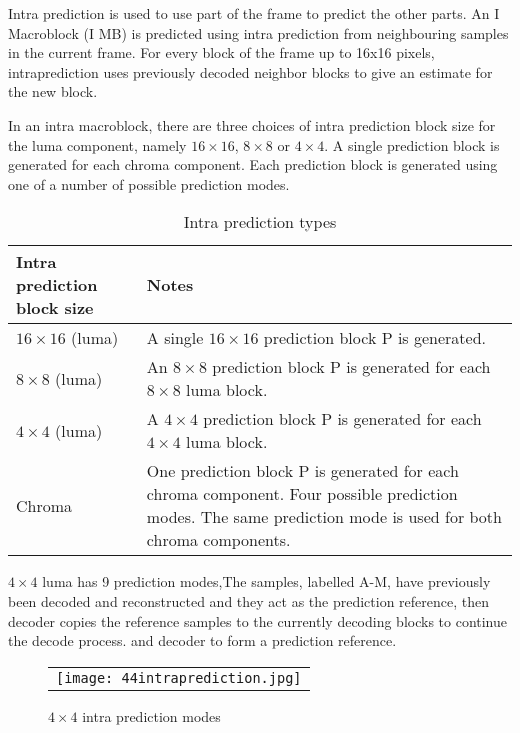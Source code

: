 \documentclass[../main.tex]{subfiles}
\begin{document}
Intra prediction is used to use part of the frame
to predict the other parts. An I Macroblock (I MB) is predicted using intra prediction from neighbouring samples in the current frame. For every block of the frame up to 16x16 pixels, intraprediction uses previously decoded neighbor blocks to give an estimate for the new
block. 

In an intra macroblock, there are three choices of intra prediction block size for the luma
component, namely $16 \times 16$, $8 \times 8$ or $4 \times 4$. A single prediction block is generated for each
chroma component. Each prediction block is generated using one of a number of possible
prediction modes. 

\begin{table}[ht]
\label{tab:list}
\begin{center}       
\begin{tabular}{|l|l|} 
\hline
\rule[-1ex]{0pt}{3.5ex}  Intra prediction block size & Notes\\  
\hline
\rule[-1ex]{0pt}{3.5ex}  $16 \times 16$ (luma) & A single $16 \times 16$ prediction block P is generated.   \\
\hline
\rule[-1ex]{0pt}{3.5ex}  $8 \times 8$ (luma) & An $8 \times 8$ prediction block P is generated for each $8 \times 8$ luma block.
 \\
\hline
\rule[-1ex]{0pt}{3.5ex}  $4 \times 4$ (luma) & A $4 \times 4$ prediction block P is generated for each $4 \times 4$ luma block.   \\
\hline
\rule[-1ex]{0pt}{3.5ex}  Chroma & One prediction block P is generated for each chroma component.
Four possible prediction modes. The same prediction mode is used
for both chroma components.  \\%
\hline

\end{tabular}
\end{center}
\caption{Intra prediction types} 
\end{table}

$4 \times 4$ luma has 9 prediction modes,The samples, labelled A-M, have previously been decoded and reconstructed and they act as the prediction reference, then decoder copies the reference samples to the currently decoding blocks to continue the decode process.
and decoder to form a prediction reference. 

 \begin{figure} [ht]
   \begin{center}
   \begin{tabular}{c} %
   \texttt{[image: 44intraprediction.jpg]}
   \end{tabular}
   \end{center}
   \caption[example] 
   { \label{fig:example} 
$4 \times 4$ intra prediction modes }
   \end{figure}     %
   
\end{document}
